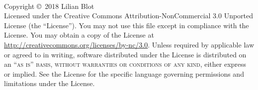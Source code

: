 \documentclass[12pt, openany, oneside]{book} %
\begin{document}


\begingroup
\thispagestyle{empty}
\vfill
\endgroup



\newpage
~\vfill
\thispagestyle{empty}

\noindent Copyright \copyright\ 2018 Lilian Blot\\ %

%

\noindent Licensed under the Creative Commons Attribution-NonCommercial 3.0 Unported License (the ``License''). You may not use this file except in compliance with the License. You may obtain a copy of the License at \url{http://creativecommons.org/licenses/by-nc/3.0}. Unless required by applicable law or agreed to in writing, software distributed under the License is distributed on an \textsc{``as is'' basis, without warranties or conditions of any kind}, either express or implied. See the License for the specific language governing permissions and limitations under the License.\\ %
\end{document}
